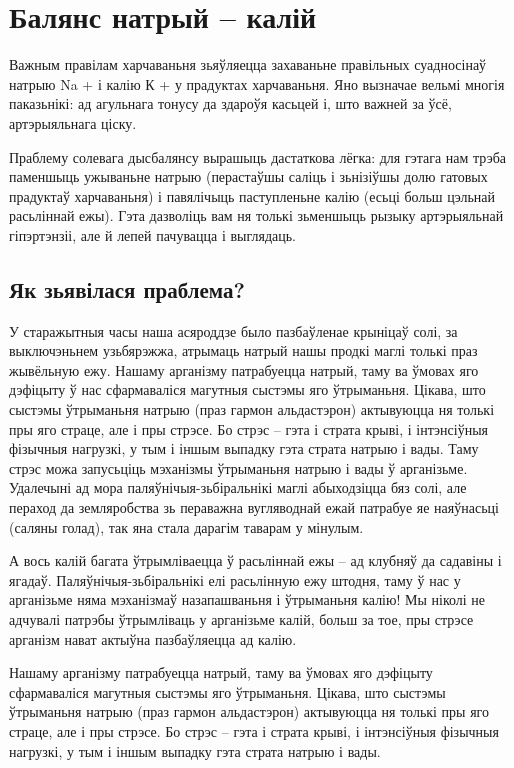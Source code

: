 \chapter{Балянс натрый – калій}

Важным правілам харчаваньня зьяўляецца захаваньне правільных суадносінаў натрыю Na + і калію К + у прадуктах харчаваньня. Яно вызначае вельмі многія паказьнікі: ад агульнага тонусу да здароўя касьцей і, што важней за ўсё, артэрыяльнага ціску.

Праблему солевага дысбалянсу вырашыць дастаткова лёгка: для гэтага нам трэба паменшыць ужываньне натрыю (перастаўшы саліць і зьнізіўшы долю гатовых прадуктаў харчаваньня) і павялічыць паступленьне калію (есьці больш цэльнай расьліннай ежы). Гэта дазволіць вам ня толькі зьменшыць рызыку артэрыяльнай гіпэртэнзіі, але й лепей пачувацца і выглядаць.

\section{Як зьявілася праблема?}

У старажытныя часы наша асяроддзе было пазбаўленае крыніцаў солі, за выключэньнем узьбярэжжа, атрымаць натрый нашы продкі маглі толькі праз жывёльную ежу. Нашаму арганізму патрабуецца натрый, таму ва ўмовах яго дэфіцыту ў нас сфармаваліся магутныя сыстэмы яго ўтрыманьня. Цікава, што сыстэмы ўтрыманьня натрыю (праз гармон альдастэрон) актывуюцца ня толькі пры яго страце, але і пры стрэсе. Бо стрэс – гэта і страта крыві, і інтэнсіўныя фізычныя нагрузкі, у тым і іншым выпадку  гэта страта натрыю і вады. Таму стрэс можа запусьціць мэханізмы ўтрыманьня натрыю і вады ў арганізьме. Удалечыні ад мора паляўнічыя-зьбіральнікі маглі абыходзіцца бяз солі, але пераход да земляробства зь пераважна вугляводнай ежай патрабуе яе наяўнасьці (саляны голад), так яна стала дарагім таварам у мінулым.

А вось калій багата ўтрымліваецца ў расьліннай ежы – ад клубняў да садавіны і ягадаў. Паляўнічыя-зьбіральнікі елі расьлінную ежу штодня, таму ў нас у арганізьме няма мэханізмаў назапашваньня і ўтрыманьня калію! Мы ніколі не адчувалі патрэбы ўтрымліваць у арганізьме калій, больш за тое, пры стрэсе арганізм нават актыўна пазбаўляецца ад калію.

Нашаму арганізму патрабуецца натрый, таму ва ўмовах яго дэфіцыту сфармаваліся магутныя сыстэмы яго ўтрыманьня. Цікава, што сыстэмы ўтрыманьня натрыю (праз гармон альдастэрон) актывуюцца ня толькі пры яго страце, але і пры стрэсе. Бо стрэс – гэта і страта крыві, і інтэнсіўныя фізычныя нагрузкі, у тым і іншым выпадку гэта страта натрыю і вады.

